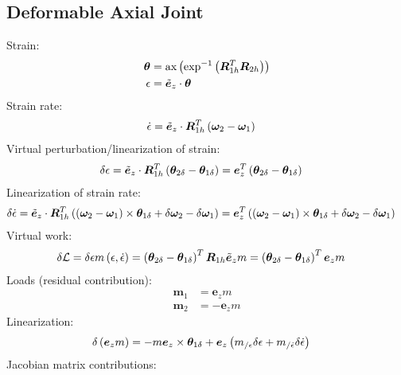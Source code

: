 \documentclass[10pt,dvips,fleqn,subeqn]{report}
\newcommand{\T}[1]{\bm{#1}}
\newcommand{\TT}[1]{\bm{#1}}
\begin{document}
\subsection{Deformable Axial Joint}
\label{sec:constraints:deformable:deformable axial joint}
Strain:
\begin{align}
	\T{\theta}
	&=
	\text{ax}\plbr{\text{exp}^{-1}\plbr{\TT{R}_{1h}^T \TT{R}_{2h}}}
	\\
	\epsilon
	&=
	\tilde{\T{e}}_z \cdot \T{\theta}
\end{align}
Strain rate:
\begin{align}
	\dot{\epsilon}
	&=
	\tilde{\T{e}}_z \cdot \TT{R}_{1h}^T\plbr{\T{\omega}_2 - \T{\omega}_1}
\end{align}
Virtual perturbation/linearization of strain:
\begin{align}
	\delta\epsilon
	&=
	\tilde{\T{e}}_z \cdot \TT{R}_{1h}^T\plbr{\T{\theta}_{2\delta} - \T{\theta}_{1\delta}}
	=
	\T{e}_z^T \plbr{\T{\theta}_{2\delta} - \T{\theta}_{1\delta}}
\end{align}
Linearization of strain rate:
\begin{align}
	\delta\dot{\epsilon}
	&=
	\tilde{\T{e}}_z \cdot \TT{R}_{1h}^T\plbr{
		\plbr{\T{\omega}_2 - \T{\omega}_1} \times \T{\theta}_{1\delta}
		+
		\delta\T{\omega}_2
		-
		\delta\T{\omega}_1
	}
	=
	\T{e}_z^T \plbr{
		\plbr{\T{\omega}_2 - \T{\omega}_1} \times \T{\theta}_{1\delta}
		+
		\delta\T{\omega}_2
		-
		\delta\T{\omega}_1
	}
\end{align}
Virtual work:
\begin{align}
	\delta\mathcal{L}
	&=
	\delta\epsilon m\plbr{\epsilon, \dot{\epsilon}}
	=
	\plbr{
		\T{\theta}_{2\delta}
		-
		\T{\theta}_{1\delta}
	}^T
	\TT{R}_{1h}
	\tilde{\T{e}}_z
	m
	=
	\plbr{
		\T{\theta}_{2\delta}
		-
		\T{\theta}_{1\delta}
	}^T
	\T{e}_z
	m
\end{align}
Loads (residual contribution):
\begin{subequations}
\begin{align}
	\T{m}_1
	&=
	\T{e}_z m
	\\
	\T{m}_2
	&=
	- \T{e}_z m
\end{align}
\end{subequations}
Linearization:
\begin{align}
	\delta\plbr{\T{e}_z m}
	&=
	- m \T{e}_z \times \T{\theta}_{1\delta}
	+
	\T{e}_z \plbr{
		m_{/\epsilon} \delta\epsilon
		+
		m_{/\dot{\epsilon}} \delta\dot{\epsilon}
	}
\end{align}
Jacobian matrix contributions:
\end{document}
